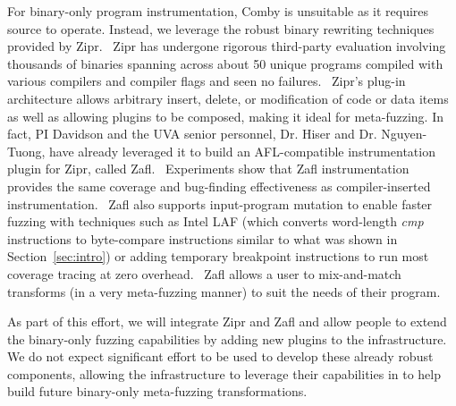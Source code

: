 

For binary-only program instrumentation, Comby is unsuitable as it requires source to operate.
Instead, we leverage the robust binary rewriting techniques provided by Zipr.~\cite{hawkins2017zipr, hiser2017zipr++,zipr}
Zipr has undergone rigorous third-party evaluation involving thousands of binaries spanning across about 50 unique programs
compiled with various compilers and compiler flags and seen no failures.~\cite{schulte2022broad}
Zipr's plug-in architecture allows arbitrary insert, delete, or modification of 
code or data items as well as allowing plugins to be composed, making it ideal for meta-fuzzing.  
In fact, PI Davidson and the UVA senior personnel,
Dr. Hiser and Dr. Nguyen-Tuong, have already leveraged it to build an 
AFL-compatible instrumentation plugin for Zipr, called
Zafl.~\cite{zafl}  
Experiments show that Zafl instrumentation provides the same
coverage and bug-finding effectiveness as compiler-inserted instrumentation.~\cite{nagy2021breaking}
Zafl also supports input-program mutation to enable faster fuzzing with techniques such as Intel LAF 
(which converts word-length \textit{cmp} instructions to byte-compare instructions similar to what was 
shown in Section~\ref{sec:intro}) or adding temporary breakpoint instructions to
run most coverage tracing at zero overhead.~\cite{intel2016circumventing,nagy2021same}
Zafl allows a user to mix-and-match
transforms (in a very meta-fuzzing manner) to suit the needs of their program.

As part of this effort, we will integrate Zipr and Zafl and allow people to extend the binary-only fuzzing
capabilities by adding new plugins to the infrastructure.  We do not expect significant effort to be used to 
develop these already robust components, allowing the infrastructure to leverage their capabilities in to help
build future binary-only meta-fuzzing transformations.

